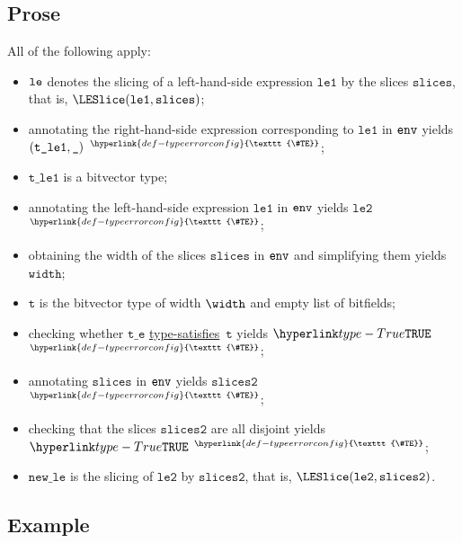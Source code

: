 \documentclass{book}
\newcommand\TypeErrorConfig[0]{\hyperlink{def-typeerrorconfig}{\texttt{\#TE}}}
\newcommand\ProseOrTypeError[0]{\hyperlink{def-proseortypeerror}{$^{\TypeErrorConfig}$}}
\newcommand\typesatisfies[0]{\hyperlink{def-typesatisfies}{type-satisfies}}
\newcommand\vt[0]{\texttt{t}}
\newcommand\vte[0]{\texttt{t\_e}}
\newcommand\vleone[0]{\texttt{le1}}
\newcommand\vletwo[0]{\texttt{le2}}
\newcommand\vtleone[0]{\texttt{t\_le1}}
\newcommand\vwidth[0]{\texttt{width}}
\newcommand\newle[0]{\texttt{new\_le}}
\newcommand\slices[0]{\texttt{slices}}
\newcommand\slicestwo[0]{\texttt{slices2}}
\begin{document}
\subsection{Prose}
All of the following apply:
\begin{itemize}
  \item $\texttt{le}$ denotes the slicing of a left-hand-side expression $\vleone$ by the slices $\slices$, that is, $\LESlice(\vleone, \slices)$;
  \item annotating the right-hand-side expression corresponding to $\vleone$ in $\texttt{env}$ yields \\
        $(\vtleone, \Ignore)$ \ProseOrTypeError;
  \item $\vtleone$ is a bitvector type;
  \item annotating the left-hand-side expression $\vleone$ in $\texttt{env}$ yields $\vletwo$ \ProseOrTypeError;
  \item obtaining the width of the slices $\slices$ in $\texttt{env}$ and simplifying them yields $\vwidth$;
  \item $\vt$ is the bitvector type of width $\width$ and empty list of bitfields;
  \item checking whether $\vte$ \typesatisfies\ $\vt$ yields $\True$ \ProseOrTypeError;
  \item annotating $\slices$ in $\texttt{env}$ yields $\slicestwo$ \ProseOrTypeError;
  \item checking that the slices $\slicestwo$ are all disjoint yields $\True$ \ProseOrTypeError;
  \item $\newle$ is the slicing of $\vletwo$ by $\slicestwo$, that is, $\LESlice(\vletwo, \slicestwo)$.
\end{itemize}

\subsection{Example}

\end{document}
